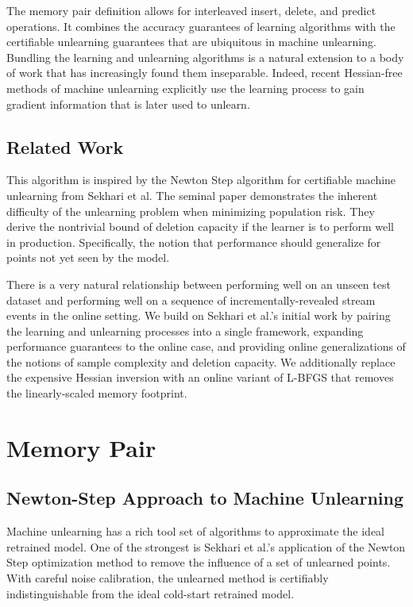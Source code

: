\documentclass[a4paper,12pt]{article}
\begin{document}
The memory pair definition allows for interleaved insert, delete, and predict operations. It combines the accuracy guarantees of learning algorithms with the certifiable unlearning guarantees that are ubiquitous in machine unlearning. Bundling the learning and unlearning algorithms is a natural extension to a body of work that has increasingly found them inseparable. Indeed, recent Hessian-free methods of machine unlearning explicitly use the learning process to gain gradient information that is later used to unlearn.

\subsection{Related Work}

This algorithm is inspired by the Newton Step algorithm for certifiable machine unlearning from Sekhari et al. The seminal paper demonstrates the inherent difficulty of the unlearning problem when minimizing population risk. They derive the nontrivial bound of deletion capacity if the learner is to perform well in production. Specifically, the notion that performance should generalize for points not yet seen by the model.

There is a very natural relationship between performing well on an unseen test dataset and performing well on a sequence of incrementally-revealed stream events in the online setting. We build on Sekhari et al.'s initial work by pairing the learning and unlearning processes into a single framework, expanding performance guarantees to the online case, and providing online generalizations of the notions of sample complexity and deletion capacity. We additionally replace the expensive Hessian inversion with an online variant of L-BFGS that removes the linearly-scaled memory footprint.

\section{Memory Pair}

\subsection{Newton-Step Approach to Machine Unlearning}

Machine unlearning has a rich tool set of algorithms to approximate the ideal retrained model. One of the strongest is Sekhari et al.'s application of the Newton Step optimization method to remove the influence of a set of unlearned points. With careful noise calibration, the unlearned method is certifiably indistinguishable from the ideal cold-start retrained model.
\end{document}
